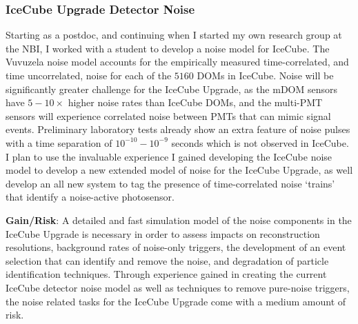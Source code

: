 \documentclass[a4paper,11pt]{article}
\begin{document}
\subsubsection{IceCube Upgrade Detector Noise}
Starting as a postdoc, and continuing when I started my own research group at the NBI, I worked with a student to develop a noise model for IceCube. The Vuvuzela noise model accounts for the empirically measured time-correlated, and time uncorrelated, noise for each of the $5160$ DOMs in IceCube\cite{Aartsen:2016nxy,Larson:thesis,Larson2018}. Noise will be significantly greater challenge for the IceCube Upgrade, as the mDOM sensors have $5-10\times$ higher noise rates than IceCube DOMs, and the multi-PMT sensors will experience correlated noise between PMTs that can mimic signal events. Preliminary laboratory tests already show an extra feature of noise pulses with a time separation of $10^{-10}-10^{-9}$ seconds which is not observed in IceCube. I plan to use the invaluable experience I gained developing the IceCube noise model to develop a new extended model of noise for the IceCube Upgrade, as well develop an all new system to tag the presence of time-correlated noise `trains' that identify a noise-active photosensor.

\textbf{Gain/Risk}: A detailed and fast simulation model of the noise components in the IceCube Upgrade is necessary in order to assess impacts on reconstruction resolutions, background rates of noise-only triggers, the development of an event selection that can identify and remove the noise, and degradation of particle identification techniques. Through experience gained in creating the current IceCube detector noise model as well as techniques to remove pure-noise triggers, the noise related tasks for the IceCube Upgrade come with a medium amount of risk.

\end{document}
